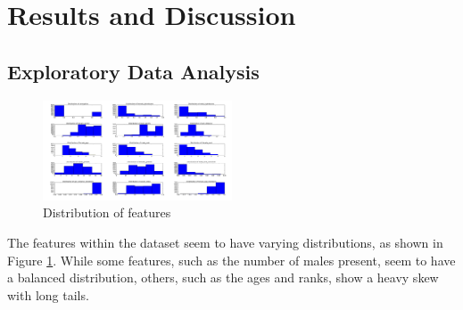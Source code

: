 \documentclass[twoside,twocolumn,paper=letter]{article}
\begin{document}
\section{Results and Discussion}
\subsection{Exploratory Data Analysis}
\begin{figure}
      \centering
          \includegraphics[width=0.5\textwidth]{../figs/all_feats_histogram.png}
  \caption{Distribution of features}
  \label{fig:figure_distrib}
\end{figure}
The features within the dataset seem to have varying distributions, as shown in
Figure \ref{fig:figure_distrib}. While some features, such as the number of
males present, seem to have a balanced distribution, others, such as the ages
and ranks, show a heavy skew with long tails.
\end{document}
